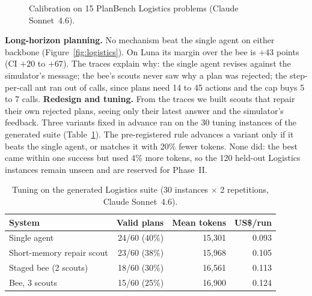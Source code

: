 \documentclass[12pt,a4paper]{article}
\newcommand{\head}[1]{\textbf{#1}}
\newcommand{\runin}[1]{\textbf{#1}\quad}
\begin{document}
\begin{figure}[H]
\centering
{}
\caption{Calibration on 15 PlanBench Logistics problems (Claude Sonnet~4.6).}
\label{fig:calib}
\end{figure}

\runin{Long-horizon planning.} No mechanism beat the single agent on either backbone
(Figure~\ref{fig:logistics}). On Luna its margin over the bee is $+43$ points (CI $+20$ to $+67$). The
traces explain why: the single agent revises against the simulator's message; the bee's scouts never saw
why a plan was rejected; the step-per-call ant ran out of calls, since plans need 14 to 45 actions and the
cap buys 5 to 7 calls. \runin{Redesign and tuning.} From the traces we built scouts that repair their own rejected plans,
seeing only their latest answer and the simulator's feedback. Three variants fixed in advance ran on the
30 tuning instances of the generated suite (Table~\ref{tab:tune}). The pre-registered rule advances a
variant only if it beats the single agent, or matches it with 20\% fewer tokens. None did: the best came
within one success but used 4\% more tokens, so the 120 held-out Logistics instances remain unseen and are
reserved for Phase~II.

\begin{table}[H]
\centering\footnotesize
\caption{Tuning on the generated Logistics suite (30 instances $\times$ 2 repetitions, Claude Sonnet~4.6).}
\label{tab:tune}
\begin{tabular}{@{}lrrr@{}}
\toprule
\head{System} & \head{Valid plans} & \head{Mean tokens} & \head{US\$/run} \\
\midrule
Single agent & 24/60 (40\%) & 15,301 & 0.093 \\
Short-memory repair scout & 23/60 (38\%) & 15,968 & 0.105 \\
Staged bee (2 scouts) & 18/60 (30\%) & 16,561 & 0.113 \\
Bee, 3 scouts & 15/60 (25\%) & 16,900 & 0.124 \\
\bottomrule
\end{tabular}
\end{table}
\end{document}
